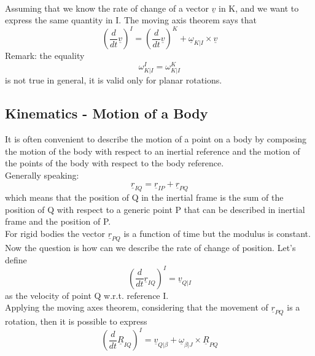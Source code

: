\begin{enumerate}
        \\
       Assuming that we know the rate of change of a vector $\underline{v}$ in K, and we want to express the same quantity in I. The moving axis theorem says that
        \begin{equation}
            \left(\frac{d}{dt}\underline{v}\right)^I = \left( \frac{d}{dt}\underline{v}\right)^K+\underline{\omega}_{K|I}\times \underline{v}
        \end{equation}
    Remark: the equality
    \begin{equation}
        \omega_{K|I}^I = \omega_{K|I}^K
    \end{equation}
    is not true in general, it is valid only for planar rotations.
\end{enumerate}

\subsection{Kinematics - Motion of a Body}
It is often convenient to describe the motion of a point on a body by composing the motion of the body with respect to an inertial reference and the motion of the points of the body with respect to the body reference.
\\
Generally speaking:
\begin{equation}
    \underline{r}_{IQ} = \underline{r}_{IP} + \underline{r}_{PQ}
 \end{equation}
which means that the position of Q in the inertial frame is the sum of the position of Q with respect to a generic point P that can be described in inertial frame and the position of P.
\\
For rigid bodies the vector $\underline{r}_{PQ}$ is a function of time but the modulus is constant.
\\
Now the question is how can we describe the rate of change of position.
Let's define 
\begin{equation}
    \left(\frac{d}{dt}\underline{r}_{IQ}\right)^I  = \underline{v}_{Q|I}
\end{equation}
as the velocity of point Q w.r.t. reference I.
\\
Applying the moving axes theorem, considering that the movement of $\underline{r}_{PQ}$ is a rotation, then it is possible to express 
\begin{equation}
    \left(\frac{d}{dt}\underline{R}_{IQ}\right)^I = \underline{v}_{Q|\beta} + \underline{\omega}_{\beta|J}\times \underline{R}_{PQ}
\end{equation}
